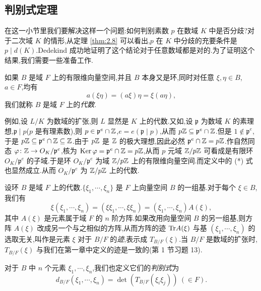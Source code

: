 \subsection{判别式定理}\label{sec:ch2-s2-4}

在这一小节里我们要解决这样一个问题:如何判别素数 $p$ 在数域 $K$ 中是否分歧?对于二次域 $K$ 的情形,从定理 \ref{thm:2.8} 可以看出,$p$ 在 $K$ 中分歧的充要条件是 $p\mid d(K)$.Dedekind 成功地证明了这个结论对于任意数域都是对的.为了证明这个结果,我们需要一些准备工作.

\setcounter{definition}{4}   %

\begin{definition}\label{def:ch2-5}
如果 $B$ 是域 $F$ 上的有限维向量空间,并且 $B$ 本身又是环,同时对任意 $\xi,\eta\in B$,$a\in F$,均有
\begin{equation}  a(\xi\eta)=(a\xi)\eta=\xi(a\eta),\tag{*}\end{equation}
我们就称 $B$ 是域 $F$ 上的\emph{代数}.
\end{definition}

例如,设 $L/K$ 为数域的扩张,则 $L$ 显然是 $K$ 上的代数.又如,设 $\mathfrak{p}$ 为数域 $K$ 的素理想,$\mathfrak{p}\mid p$($p$ 是有理素数),则 $p\in\mathfrak{p}^e\cap\mathbb{Z}$,$e=e(\mathfrak{p}\mid p)$,从而 $p\mathbb{Z}\subseteq\mathfrak{p}^e\cap\mathbb{Z}$.但是 $1\notin\mathfrak{p}^e$,于是 $p\mathbb{Z}\subseteq\mathfrak{p}^e\cap\mathbb{Z}\subseteq\mathbb{Z}$.由于 $p\mathbb{Z}$ 是 $\mathbb{Z}$ 的极大理想,因此必然 $\mathfrak{p}^e\cap\mathbb{Z}=p\mathbb{Z}$.作自然同态 $\varphi\colon\mathbb{Z}\to O_K/\mathfrak{p}^e$,核为 $\operatorname{Ker}\varphi=\mathfrak{p}^e\cap\mathbb{Z}=p\mathbb{Z}$,从而 $p$ 元域 $\mathbb{Z}/p\mathbb{Z}$ 可看成是有限环 $O_K/\mathfrak{p}^e$ 的子域.于是环 $O_K/\mathfrak{p}^e$ 为域 $\mathbb{Z}/p\mathbb{Z}$ 上的有限维向量空间.而定义中的 (*) 式也显然成立.从而 $O_K/\mathfrak{p}^e$ 为 $\mathbb{Z}/p\mathbb{Z}$ 上的代数.

设环 $B$ 是域 $F$ 上的代数.$\{\xi_1,\cdots,\xi_n\}$ 是 $F$ 上向量空间 $B$ 的一组基.对于每个 $\xi\in B$,我们有
\begin{equation}  \xi(\xi_1,\cdots,\xi_n)=(\xi\xi_1,\cdots,\xi\xi_n)=(\xi_1,\cdots,\xi_n)A(\xi),\tag{1}\end{equation}
其中 $A(\xi)$ 是元素属于域 $F$ 的 $n$ 阶方阵.如果改用向量空间 $B$ 的另一组基,则方阵 $A(\xi)$ 改成另一个与之相似的方阵,从而方阵的迹 $\mathrm{Tr} A(\xi)$ 与基 $(\xi_1,\cdots,\xi_n)$ 的选取无关,叫作是元素 $\xi$ 对于 $B/F$ 的\emph{迹},表示成 $T_{B/F}(\xi)$.当 $B/F$ 是数域的扩张时,$T_{B/F}(\xi)$ 与我们在第一章中定义的迹是一致的(第 1 节习题 13).

对于 $B$ 中 $n$ 个元素 $\xi_1,\cdots,\xi_n$,我们也定义它们的\emph{判别式}为
\[
  d_{B/F}(\xi_1,\cdots,\xi_n)=\det(T_{B/F}(\xi_i\xi_j))\ (\in F).
\]

